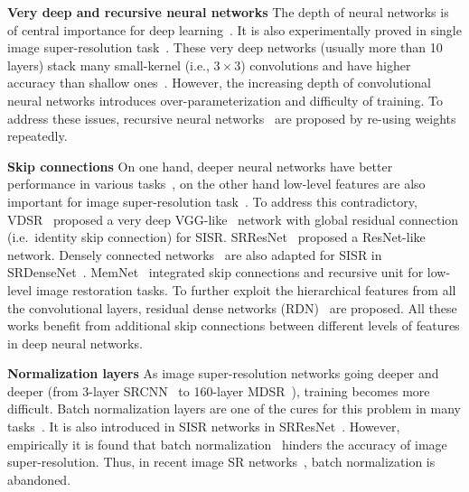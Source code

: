 \documentclass{article}
\begin{document}
\textbf{Very deep and recursive neural networks} The depth of neural networks is of central importance for deep learning~\cite{he2016deep, simonyan2014very, szegedy2017inception}. It is also experimentally proved in single image super-resolution task~\cite{fan2017balanced, kim2016accurate, ledig2016photo, lim2017enhanced, tai2017memnet, tong2017image, 2018arXiv180208797Z}. These very deep networks (usually more than 10 layers) stack many small-kernel (i.e., \(3 \times 3\)) convolutions and have higher accuracy than shallow ones~\cite{dong2016accelerating, shi2016real}. However, the increasing depth of convolutional neural networks introduces over-parameterization and difficulty of training. To address these issues, recursive neural networks~\cite{kim2016deeply, tai2017image} are proposed by re-using weights repeatedly.

\textbf{Skip connections} On one hand, deeper neural networks have better performance in various tasks~\cite{simonyan2014very}, on the other hand low-level features are also important for image super-resolution task~\cite{2018arXiv180208797Z}. To address this contradictory,  VDSR~\cite{kim2016accurate} proposed a very deep VGG-like~\cite{simonyan2014very} network with global residual connection (i.e.\ identity skip connection) for SISR. SRResNet~\cite{ledig2016photo} proposed a ResNet-like~\cite{he2016deep} network. Densely connected networks~\cite{huang2017densely} are also adapted for SISR in SRDenseNet~\cite{tong2017image}. MemNet~\cite{tai2017memnet} integrated skip connections and recursive unit for low-level image restoration tasks. To further exploit the hierarchical features from all the convolutional layers, residual dense networks (RDN)~\cite{2018arXiv180208797Z} are proposed. All these works benefit from additional skip connections between different levels of features in deep neural networks.

\textbf{Normalization layers} As image super-resolution networks going deeper and deeper (from 3-layer SRCNN~\cite{dong2014learning} to 160-layer MDSR~\cite{lim2017enhanced}), training becomes more difficult. Batch normalization layers are one of the cures for this problem in many tasks~\cite{he2016deep, szegedy2017inception}. It is also introduced in SISR networks in SRResNet~\cite{ledig2016photo}. However, empirically it is found that batch normalization~\cite{ioffe2015batch} hinders the accuracy of image super-resolution. Thus, in recent image SR networks~\cite{fan2017balanced, lim2017enhanced, 2018arXiv180208797Z}, batch normalization is abandoned.
\end{document}
